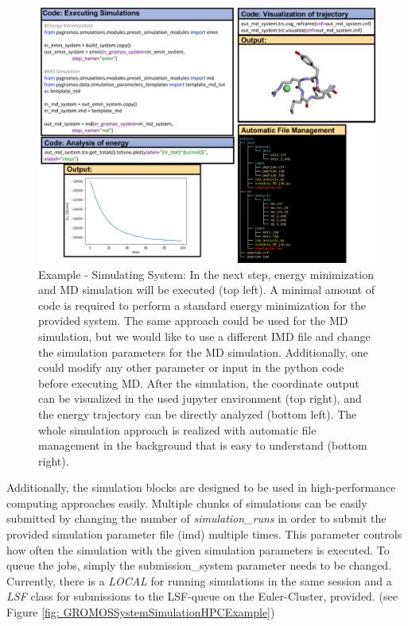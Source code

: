 \begin{figure}[h!]
    \centering
    \includegraphics[width=\textwidth]{fig/ApplicationExamples/codeExample_GROMOSSystemSimulation.png}
    \caption{Example - Simulating System: In the next step, energy minimization and MD simulation will be executed (top left). A minimal amount of code is required to perform a standard energy minimization for the provided system. The same approach could be used for the MD simulation, but we would like to use a different IMD file and change the simulation parameters for the MD simulation. Additionally, one could modify any other parameter or input in the python code before executing MD. After the simulation, the coordinate output can be visualized in the used jupyter environment (top right), and the energy trajectory can be directly analyzed (bottom left). The whole simulation approach is realized with automatic file management in the background that is easy to understand (bottom right).  }
    \label{fig: GROMOSSystemSimulationExample}
\end{figure}

Additionally, the simulation blocks are designed to be used in high-performance computing approaches easily. Multiple chunks of simulations can be easily submitted by changing the number of \textit{simulation\_runs} in order to submit the provided simulation parameter file (imd) multiple times. This parameter controls how often the simulation with the given simulation parameters is executed. To queue the jobs, simply the submission\_system parameter needs to be changed. Currently, there is a \textit{LOCAL} for running simulations in the same session and a \textit{LSF} class for submissions to the LSF-queue on the Euler-Cluster,  provided.  (see Figure \ref{fig: GROMOSSystemSimulationHPCExample})

